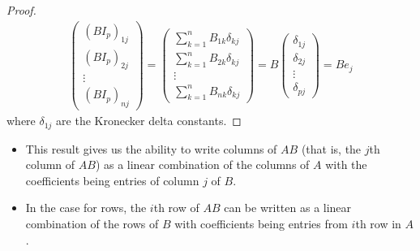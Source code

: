 \begin{proof}
\begin{align*}
\begin{pmatrix}
        (B {I}_{p})_{1j} \\  
        {(B{I}_{p})}_{2j} \\
        \vdots \\
        {(B {I}_{p})}_{nj}
   \end{pmatrix} = \begin{pmatrix}
       \sum_{ k=1  }^{ n } {B}_{1k} {\delta}_{kj} \\
       \sum_{ k=1  }^{ n } {B}_{2k} {\delta}_{kj } \\
       \vdots \\
       \sum_{ k=1  }^{ n } {B}_{nk} {\delta}_{kj } 
       \end{pmatrix} = B \begin{pmatrix}
       {\delta}_{1j } \\
       {\delta}_{2j } \\
       \vdots \\
       {\delta}_{pj } 
   \end{pmatrix} = B {e}_{j}
\end{align*}
where \( {\delta}_{1j} \) are the Kronecker delta constants.
\end{proof}

\begin{itemize}
    \item This result gives us the ability to write columns of \( AB  \) (that is, the \( j \)th column of \( AB \)) as a linear combination of the columns of \( A  \) with the coefficients being entries of column \( j  \) of \( B  \).
    \item In the case for rows, the \( i \)th row of \( AB  \) can be written as a linear combination of the rows of \( B  \) with coefficients being entries from \( i \)th row in \( A  \).
\end{itemize}

